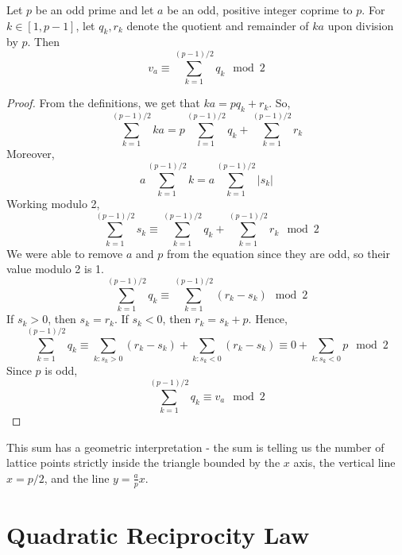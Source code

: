 \documentclass[12pt,letterpaper]{book}
\theoremstyle{definition}
\begin{document}
\begin{lemma}
  Let $p$ be an odd prime and let $a$ be an odd, positive integer coprime to $p$. For $k \in [1,p-1]$, let $q_k,r_k$ denote the quotient and remainder of $ka$ upon division by $p$. Then
  \[v_a \equiv \sum_{k=1}^{(p-1)/2} q_k \mod 2\]
\end{lemma}
\begin{proof}
  From the definitions, we get that $ka = pq_k + r_k$. So,
  \[\sum_{k=1}^{(p-1)/2} ka = p \sum_{l=1}^{(p-1)/2} q_k + \sum_{k=1}^{(p-1)/2} r_k\]
  Moreover,
  \[a\sum_{k=1}^{(p-1)/2}k = a \sum_{k=1}^{(p-1)/2} |s_k|\]
  Working modulo 2, 
  \[\sum_{k=1}^{(p-1)/2} s_k \equiv \sum_{k=1}^{(p-1)/2} q_k + \sum_{k=1}^{(p-1)/2} r_k\mod 2\]
  We were able to remove $a$ and $p$ from the equation since they are odd, so their value modulo 2 is 1.
  \[\sum_{k=1}^{(p-1)/2} q_k \equiv \sum_{k=1}^{(p-1)/2} (r_k - s_k) \mod 2\]
  If $s_k > 0$, then $s_k = r_k$. If $s_k < 0$, then $r_k = s_k+p$. Hence,
  \[\sum_{k=1}^{(p-1)/2} q_k \equiv \sum_{k : s_k > 0} (r_k - s_k) + \sum_{k : s_k < 0} (r_k - s_k) \equiv 0 + \sum_{k : s_k < 0} p \mod 2 \]
  Since $p$ is odd, 
  \[\sum_{k=1}^{(p-1)/2} q_k \equiv v_a \mod 2\]
\end{proof}

This sum has a geometric interpretation - the sum is telling us the number of lattice points strictly inside the triangle bounded by the $x$ axis, the vertical line $x=p/2$, and the line $y = \frac{a}{p}x$.

\section{Quadratic Reciprocity Law}
\end{document}
